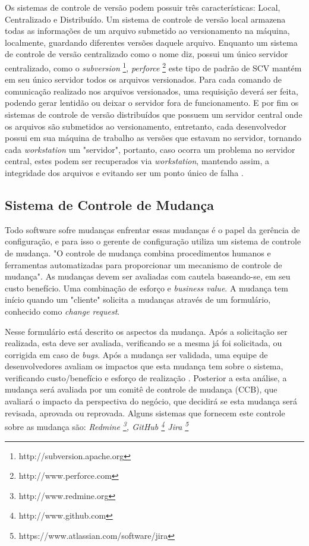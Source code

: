 Os sistemas de controle de versão podem possuir três características: Local, Centralizado e Distribuído. Um sistema de controle de versão local armazena todas as informações de um arquivo submetido ao versionamento na máquina, localmente, guardando diferentes versões daquele arquivo. Enquanto um sistema de controle de versão centralizado como o nome diz, possui um único servidor centralizado, como o \textit{subversion} \footnote{http://subversion.apache.org}, \textit{perforce} \footnote{http://www.perforce.com} este tipo de padrão de SCV mantém em seu único servidor todos os arquivos versionados. Para cada comando de comunicação realizado nos arquivos versionados, uma requisição deverá ser feita, podendo gerar lentidão ou deixar o servidor fora de funcionamento. E por fim os sistemas de controle de versão distribuídos que possuem um servidor central onde os arquivos são submetidos ao versionamento, entretanto, cada desenvolvedor possui em sua máquina de trabalho as versões que estavam no servidor, tornando cada \textit{workstation} um "servidor", portanto, caso ocorra um problema no servidor central, estes podem ser recuperados via \textit{workstation}, mantendo assim, a integridade dos arquivos e evitando ser um ponto único de falha \cite{git}	.


\subsection{Sistema de Controle de Mudança}
Todo software sofre mudanças enfrentar essas mudanças é o papel da gerência de configuração, e para isso o gerente de configuração utiliza um sistema de controle de mudança. "O controle de mudança combina procedimentos humanos e ferramentas automatizadas para proporcionar um mecanismo de controle de mudança"\space {}. As mudanças devem ser avaliadas com cautela baseando-se, em seu custo benefício. Uma combinação de esforço e \textit{business value}. A mudança tem início quando um "cliente" solicita a mudanças através de um formulário, conhecido como \textit{change request}.

 Nesse formulário está descrito os aspectos da mudança. Após a solicitação ser realizada, esta deve ser avaliada, verificando se a mesma já foi solicitada, ou corrigida em caso de \textit{bugs}. Após a mudança ser validada, uma equipe de desenvolvedores avaliam os impactos que esta mudança tem sobre o sistema, verificando custo/benefício e esforço de realização \cite{sommerville2011}. Posterior a esta análise, a mudança será avaliada por um comitê de controle de mudança (CCB), que avaliará o impacto da perspectiva do negócio, que decidirá se esta mudança será revisada, aprovada ou reprovada. Alguns sistemas que fornecem este controle sobre as mudança são: \textit{Redmine \footnote{http://www.redmine.org}, GitHub \footnote{http://www.github.com} Jira \footnote{https://www.atlassian.com/software/jira}}
